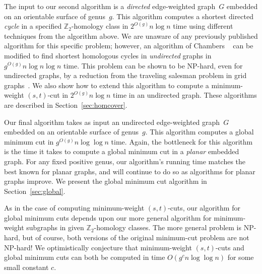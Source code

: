 \documentclass[11pt,twoside]{article}
\def\Z{\mathbb{Z}}
\begin{document}
The input to our second algorithm is a \emph{directed} edge-weighted graph~$G$ embedded on an orientable surface of genus~$g$.
%
This algorithm computes a shortest directed \emph{cycle} in a specified $\Z_2$-homology class in $2^{O(g)}n\log n$ time using different techniques from the algorithm above.
We are unaware of any previously published algorithm for this specific problem; however, an algorithm of Chambers \etal~\cite{ccelw-scsih-08} can be modified to find shortest homologous cycles in \emph{undirected} graphs in $g^{O(g)} n\log n \log n$ time.
This problem can be shown to be {NP}-hard, even for undirected graphs, by a reduction from the traveling salesman problem in grid graphs~\cite{ccelw-scsih-08}.
We also show how to extend this algorithm to compute a minimum-weight $(s,t)$-cut in $2^{O(g)}n\log n$ time in an undirected graph.
These algorithms are described in Section~\ref{sec:homcover}.

Our final algorithm takes as input an undirected edge-weighted graph~$G$ embedded on an orientable surface of genus~$g$.
This algorithm computes a global minimum cut in $g^{O(g)}n\log \log n$ time.
Again, the bottleneck for this algorithm is the time it takes to compute a global minimum cut in a \emph{planar} embedded graph.
For any fixed positive genus, our algorithm's running time matches the best known for planar graphs, and will continue to do so as algorithms for planar graphs improve.
We present the global minimum cut algorithm in Section~\ref{sec:global}.

As in the case of computing minimum-weight $(s,t)$-cuts, our algorithm for global minimum cuts depends upon our more general algorithm for minimum-weight subgraphs in given $\Z_2$-homology classes.
The more general problem is NP-hard, but of course, both versions of the original minimum-cut problem are not NP-hard!
We optimistically conjecture that minimum-weight $(s,t)$-cuts and global minimum cuts can both be computed in time $O(g^c n\log \log n)$ for some small constant $c$.

\end{document}
